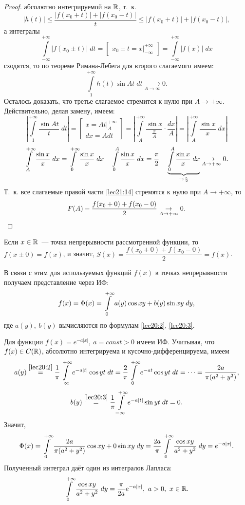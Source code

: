 \documentclass[../../main.tex]{subfiles}
\begin{document}
\begin{proof}
	абсолютно интегрируемой на $ \mathbb{R} $, т.~к.
	\[
	|h(t)| \leq \dfrac{|f(x_0 + t)| + |f(x_0 - t)|}{t} \leq
	|f(x_0 + t)| + |f(x_0 - t)|,
	\]
	а интегралы 
	\[
	\int\limits_{-\infty}^{+\infty} |f(x_0 \pm t)|\;dt = 
	\begin{bmatrix}
	x_0 \pm t = x\big|_{-\infty}^{+\infty}
	\end{bmatrix} =
	\int\limits_{-\infty}^{+\infty} |f(x)|\;dx
	\] сходятся, то по теореме Римана-Лебега для второго слагаемого имеем:
	\[
	\int\limits_{1}^{+\infty} h(t) \sin At\;dt
	\underset{A \to \infty}{\to} 0.
	\]
	Осталось доказать, что третье слагаемое 
	стремится к нулю при $ A \to +\infty $.
	Действительно, делая замену, имеем:
	\[
	\left|
	\int\limits_{1}^{+\infty} \dfrac{\sin At}{t}\;dt
	\right| = \begin{bmatrix}
	x = At\big|_{A}^{+\infty} \\
	dx = Adt
	\end{bmatrix} = 
	\left|
	\int\limits_{A}^{+\infty} \dfrac{\sin x}{\frac{x}{A}}\cdot \dfrac{dx}{A}
	\right| = \left|
	\int\limits_{A}^{+\infty} \dfrac{\sin x}{x}\;dx
	\right|
	\]
	\[
	\int\limits_{A}^{+\infty} \dfrac{\sin x}{x}\;dx =
	\int\limits_{0}^{+\infty} \dfrac{\sin x}{x}\;dx - \int\limits_{0}^{A}
	\dfrac{\sin x}{x}\;dx = \dfrac{\pi}{2} -
	\underbrace{\int\limits_{0}^{A} \dfrac{\sin x}{x}\;dx}_{\to\frac\pi2}
	\underset{A \to +\infty}{\to} 0.
	\]
	Т.~к. все слагаемые правой части \eqref{lec21:14} стремятся к нулю при
	$ A \to +\infty $, то
	\[
	F(A) - \dfrac{f(x_0 + 0) + f(x_0 - 0)}{2} 
	\underset{A \to +\infty}{\to} 0. \qedhere
	\]
\end{proof}
\begin{rem}
	Если $ x \in \mathbb{R} $~--- точка непрерывности рассмотренной функции, 
	то ${f(x \pm 0) = f(x)}$, и значит, 
	$ S(x) = \dfrac{f(x_0 + 0) + f(x_0 - 0)}{2} = f(x) $.
\end{rem}
В связи с этим для используемых функций $ f(x) $ в точках непрерывности 
получаем представление через ИФ:
\[
f(x) = \Phi(x) = \int\limits_{0}^{+\infty}
a(y) \cos xy + b(y) \sin xy\;dy,
\] где $ a(y),\ b(y) $ вычисляются по формулам \eqref{lec20:2}, 
\eqref{lec20:3}.
\begin{exmp}
	Для функции $ f(x) = e^{-a|x|},\ a = const > 0 $ имеем ИФ. Учитывая, что
	${f(x) \in C(\mathbb{R})}$, абсолютно интегрируема и кусочно-дифференцируема, имеем
	\[
	a(y) \stackrel{\eqref{lec20:2}}{=}
	\dfrac{1}{\pi} \int\limits_{-\infty}^{+\infty}
	e^{-a|t|} \cos yt\;dt = \dfrac{2}{\pi}
	\int\limits_{0}^{+\infty} e^{-at} \cos yt\;dt = \dots = \dfrac{2a}{\pi(a^2 + y^2)},
	\] 
	\[
	b(y) \stackrel{\eqref{lec20:3}}{=}
	\dfrac{1}{\pi} \int\limits_{-\infty}^{+\infty}
	e^{-a|t|}\sin yt\;dt = 0.
	\]
	Значит,
	\[
	\Phi(x) = \int\limits_{0}^{+\infty} \dfrac{2a}{\pi(a^2 + y^2)} \cos xy + 0 \sin xy\;dy =
	\dfrac{2a}{\pi} \int\limits_{0}^{+\infty} \dfrac{\cos xy}{a^2 + y^2}\;dy = e^{-a|x|}.
	\]
	Полученный интеграл даёт один из интегралов Лапласа:
	\[
	\int\limits_{0}^{+\infty} \dfrac{\cos xy}{a^2 + y^2}\;dy =
	\dfrac{\pi}{2a} e^{-a|x|},\ a > 0,\ x \in \mathbb{R}.
	\]
\end{exmp}
\end{document}
